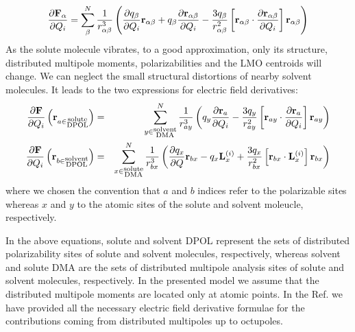 \documentclass[a4paper,titlepage,twoside,fleqn,12pt]{book}
\newcommand{\fderiv}[2]{\ensuremath{
\frac{\partial #1}{\partial #2}}}
\begin{document}
\begin{refsection}
%
\begin{equation}
\fderiv{{\bf F}_\alpha}{Q_i} = \sum_\beta^N \frac{1}{r_{\alpha\beta}^3}  
        \left(
            \fderiv{q_\beta}{Q_i}{\bf r}_{\alpha\beta} + q_\beta \fderiv{{\bf r}_{\alpha\beta}}{Q_i} - \frac{3q_\beta}{r_{\alpha\beta}^2} 
                \left[ 
                     {\bf r}_{\alpha\beta} \cdot \fderiv{{\bf r}_{\alpha\beta}}{Q_i} 
                \right] {\bf r}_{\alpha\beta}
        \right)
\end{equation}
%
As the solute molecule vibrates, to a good approximation, 
only its structure, distributed multipole moments, polarizabilities 
and the LMO centroids will change. We can neglect the small 
structural distortions of nearby solvent molecules. 
It leads to the two expressions for electric field derivatives:
%
\begin{eqnarray}
\fderiv{{\bf F}}{Q_i} \left({\bf r}_{a\in\substack{\text{solute}\\\text{DPOL}}} \right)
   &=& \sum_{y\in\substack{\text{solvent}\\\text{DMA}}}^N \frac{1}{r_{ay}^3}  
        \left(
                q_y \fderiv{{\bf r}_{a}}{Q_i} - \frac{3q_y}{r_{ay}^2} 
                \left[ 
                     {\bf r}_{ay} \cdot \fderiv{{\bf r}_{a}}{Q_i} 
                \right] {\bf r}_{ay}
        \right) \\
%
\fderiv{{\bf F}}{Q_i} \left({\bf r}_{b\in\substack{\text{solvent}\\\text{DPOL}}} \right)
    &=& \sum_{x\in\substack{\text{solute}\\\text{DMA}}}^N \frac{1}{r_{bx}^3}  
        \left(
            \fderiv{q_x}{Q}{\bf r}_{bx} - q_x {\bf L}_x^{(i)} + \frac{3q_x}{r_{bx}^2} 
                \left[ 
                     {\bf r}_{bx} \cdot {\bf L}_x^{(i)}
                \right] {\bf r}_{bx}
        \right)
\end{eqnarray}
%
where we chosen the convention that $a$ and $b$ indices refer to the 
polarizable sites whereas $x$ and $y$ to the atomic sites of the solute
and solvent moleucle, respectively.

In the above equations, solute and solvent DPOL represent the sets 
of distributed polarizability sites of solute and solvent molecules, 
respectively, whereas solvent and solute DMA are the sets of distributed 
multipole analysis sites of solute and solvent molecules, respectively. 
In the presented model we assume that the distributed multipole moments are located only at atomic points.
In the Ref.\citep{Blasiak.Cho.JCP.2014} we have provided all the 
necessary electric field derivative formulae for the contributions
coming from distributed multipoles up to octupoles. 


\end{refsection}
\end{document}

